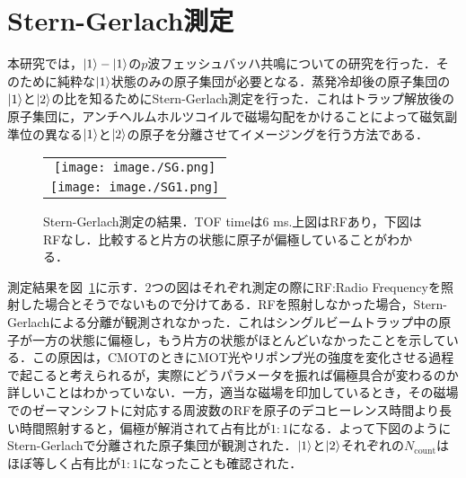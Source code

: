 \documentclass[11pt,a4j,notitlepage]{jreport}
\newcommand{\fig}[1]{図~\ref{#1}}	%
\begin{document}
\section{Stern-Gerlach測定}
本研究では，$\ket{1}-\ket{1}$の$p$波フェッシュバッハ共鳴についての研究を行った．そのために純粋な$\ket{1}$状態のみの原子集団が必要となる．蒸発冷却後の原子集団の$\ket{1}$と$\ket{2}$の比を知るためにStern-Gerlach測定を行った．これはトラップ解放後の原子集団に，アンチヘルムホルツコイルで磁場勾配をかけることによって磁気副準位の異なる$\ket{1}$と$\ket{2}$の原子を分離させてイメージングを行う方法である．
\begin{figure}[H]
	\begin{tabular}{c}
		\begin{minipage}[t]{1\hsize}
			\centering
				\texttt{[image: image./SG.png]}
		\end{minipage} \\
		\begin{minipage}[t]{1\hsize}
			\centering
				\texttt{[image: image./SG1.png]}
		\end{minipage}
	\end{tabular}
	\caption{Stern-Gerlach測定の結果．TOF timeは6 ms.上図はRFあり，下図はRFなし．比較すると片方の状態に原子が偏極していることがわかる．}
	\label{fig4.1.1}
\end{figure}
測定結果を\fig{fig4.1.1}に示す．$2$つの図はそれぞれ測定の際にRF:Radio Frequencyを照射した場合とそうでないもので分けてある．RFを照射しなかった場合，Stern-Gerlachによる分離が観測されなかった．これはシングルビームトラップ中の原子が一方の状態に偏極し，もう片方の状態がほとんどいなかったことを示している．この原因は，CMOTのときにMOT光やリポンプ光の強度を変化させる過程で起こると考えられるが，実際にどうパラメータを振れば偏極具合が変わるのか詳しいことはわかっていない．一方，適当な磁場を印加しているとき，その磁場でのゼーマンシフトに対応する周波数のRFを原子のデコヒーレンス時間より長い時間照射すると，偏極が解消されて占有比が$1:1$になる．よって下図のようにStern-Gerlachで分離された原子集団が観測された．$\ket{1}$と$\ket{2}$それぞれの$N_{\mathrm{count}}$はほぼ等しく占有比が$1:1$になったことも確認された．
\end{document}
